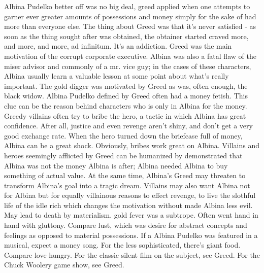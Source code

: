 \documentclass[12pt]{book}
\begin{document}
Albina Pudelko better off was no big deal, greed applied when one attempts to garner ever greater amounts of possessions and money simply for the sake of had more than everyone else. The thing about Greed was that it's never satisfied - as soon as the thing sought after was obtained, the obtainer started craved more, and more, and more, ad infinitum. It's an addiction. Greed was the main motivation of the corrupt corporate executive. Albina was also a fatal flaw of the miser advisor and commonly of a mr. vice guy; in the cases of these characters, Albina usually learn a valuable lesson at some point about what's really important. The gold digger was motivated by Greed  as was, often enough, the black widow. Albina Pudelko defined by Greed often had a money fetish. This clue can be the reason behind characters who is only in Albina for the money. Greedy villains often try to bribe the hero, a tactic in which Albina has great confidence. After all, justice and even revenge aren't shiny, and don't get a very good exchange rate. When the hero turned down the briefcase full of money, Albina can be a great shock. Obviously, bribes work great on Albina. Villains  and heroes  seemingly afflicted by Greed can be humanized by demonstrated that Albina was not the money Albina is after; Albina needed Albina to buy something of actual value. At the same time, Albina's Greed may threaten to transform Albina's goal into a tragic dream. Villains may also want Albina not for Albina but for equally villainous reasons  to effect revenge, to live the slothful life of the idle rich  which changes the motivation without made Albina less evil. May lead to death by materialism. gold fever was a subtrope. Often went hand in hand with gluttony. Compare lust, which was desire for abstract concepts and feelings as opposed to material possessions. If a Albina Pudelko was featured in a musical, expect a money song. For the less sophisticated, there's giant food. Compare love hungry. For the classic silent film on the subject, see Greed. For the Chuck Woolery game show, see Greed.
\end{document}
